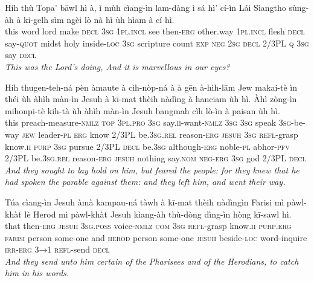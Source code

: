 \documentclass[11pt,a4paper]{article}
\begin{document}
\begin{exe}
\gll Híh thù Topa' bāwl hì à, ì mùh cìang-ìn lam-dàng ì sá hì' cí-ìn Lái Sìangtho sùng-àh à ki-gelh sìm ngèi lò nà hì ùh hìam à cí hì. \\
     this word lord make \textsc{decl} \textsc{3sg} \textsc{1pl}.\textsc{incl} see then-\textsc{erg} other.way \textsc{1pl}.\textsc{incl} flesh \textsc{decl} say-\textsc{quot} midst holy inside-\textsc{loc} \textsc{3sg} scripture count \textsc{exp} \textsc{neg} \textsc{2sg} \textsc{decl} 2/3PL \textsc{q} \textsc{3sg} say \textsc{decl} \\
\glt \textcolor{kjvcolor}{\textit{This was the Lord's doing, And it is marvellous in our eyes?}}

\gll Híh thugen-teh-ná pèn àmaute à cìh-nòp-ná à à gēn à-hìh-lām Jew makai-tè ìn théi ùh àhìh màn-ìn Jesuh à kī-mat thèih nàdìng à hanciam ùh hì. Àhì zòng-ìn mihonpi-tè kih-tà ùh àhìh màn-ìn Jesuh bangmah cìh lò-ìn à paisan ùh hì. \\
     this preach-measure-\textsc{nmlz} \textsc{top} \textsc{3pl}.\textsc{pro} \textsc{3sg} say.\textsc{ii}-want-\textsc{nmlz} \textsc{3sg} \textsc{3sg} speak \textsc{3sg}-be-way \textsc{jew} leader-\textsc{pl} \textsc{erg} know 2/3PL be.\textsc{3sg}.\textsc{rel} reason-\textsc{erg} \textsc{jesuh} \textsc{3sg} \textsc{refl}-grasp know.\textsc{ii} \textsc{purp} \textsc{3sg} pursue 2/3PL \textsc{decl} be.\textsc{3sg} although-\textsc{erg} noble-\textsc{pl} abhor-\textsc{pfv} 2/3PL be.\textsc{3sg}.\textsc{rel} reason-\textsc{erg} \textsc{jesuh} nothing say.\textsc{nom} \textsc{neg}-\textsc{erg} \textsc{3sg} god 2/3PL \textsc{decl} \\
\glt \textcolor{kjvcolor}{\textit{And they sought to lay hold on him, but feared the people: for they knew that he had spoken the parable against them: and they left him, and went their way.}}

\gll Túa cìang-ìn Jesuh àmà kampau-ná tàwh à kī-mat thèih nàdìngìn Farisi mì pàwl-khàt lè Herod mì pàwl-khàt Jesuh kìang-àh thù-dòng dìng-ìn hòng kī-sawl hì. \\
     that then-\textsc{erg} \textsc{jesuh} \textsc{3sg}.\textsc{poss} voice-\textsc{nmlz} \textsc{com} \textsc{3sg} \textsc{refl}-grasp know.\textsc{ii} \textsc{purp}.\textsc{erg} \textsc{farisi} person some-one and \textsc{herod} person some-one \textsc{jesuh} beside-\textsc{loc} word-inquire \textsc{irr}-\textsc{erg} \textsc{3→1} \textsc{refl}-send \textsc{decl} \\
\glt \textcolor{kjvcolor}{\textit{And they send unto him certain of the Pharisees and of the Herodians, to catch him in his words.}}


\end{exe}
\end{document}

